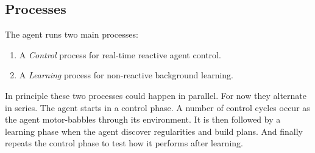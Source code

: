 \documentclass[runningheads]{llncs}
\begin{document}
\subsection{Processes}
The agent runs two main processes:
\begin{enumerate}
\item A \emph{Control} process for real-time reactive agent control.
\item A \emph{Learning} process for non-reactive background learning.
\end{enumerate}
In principle these two processes could happen in parallel.  For now
they alternate in series.  The agent starts in a control phase.  A
number of control cycles occur as the agent motor-babbles through its
environment.  It is then followed by a learning phase when the agent
discover regularities and build plans.  And finally repeats the
control phase to test how it performs after learning.
\end{document}
